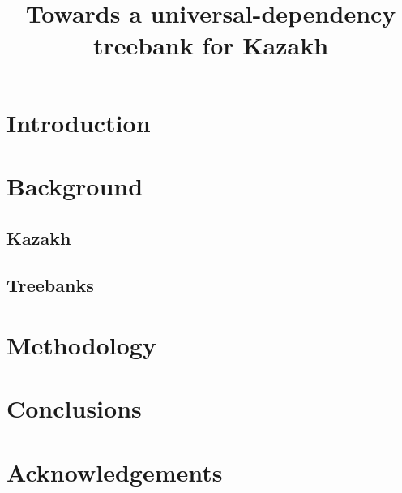 \documentclass[a4paper,11pt,twocolumn]{article}
\title{Towards a universal-dependency treebank for Kazakh}
\begin{document}
\maketitleabstract{}


\section{Introduction}

\citet{hargle}

\section{Background}

\subsection{Kazakh}

\subsection{Treebanks} %

\section{Methodology}

\section{Conclusions}

\section*{Acknowledgements}



\end{document}
